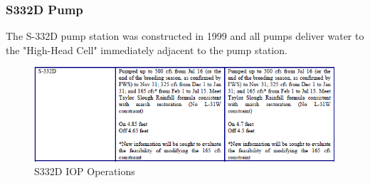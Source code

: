 \clearpage
\subsubsection{S332D Pump}
The S-332D pump station was constructed in 1999 and all pumps deliver water to the "High-Head Cell" immediately adjacent to the pump station.

\begin{figure}[!h]
  \begin{center}
  \includegraphics[width=6.5in]{../figs/S332D_IOPops.png}
  \caption{S332D IOP Operations}
  \label{fig:S332Diop}
  \end{center}
\end{figure}




